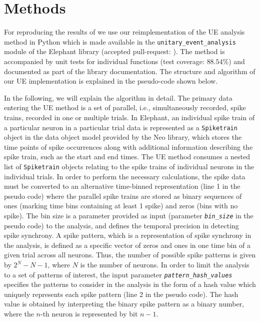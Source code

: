 \documentclass[10pt,a4paper,onecolumn]{article}
\begin{document}
\section{Methods}\label{methods}

For reproducing the results of \autocite{Riehle97} we use our
reimplementation of the UE analysis method in Python which is made
available in the \texttt{unitary\_event\_analysis} module of the
Elephant library (accepted pull-request: \autocite{Pullrequest_UE}). The
method is accompanied by unit tests for individual functions (test
coverage: \(88.54\%\)) and documented as part of the library
documentation. The structure and algorithm of our UE implementation is
explained in the pseudo-code shown below.

In the following, we will explain the algorithm in detail. The primary
data entering the UE method is a set of parallel, i.e., simultaneously
recorded, spike trains, recorded in one or multiple trials. In Elephant,
an individual spike train of a particular neuron in a particular trial
data is represented as a \texttt{Spiketrain} object in the data object
model provided by the Neo library, which stores the time points of spike
occurrences along with additional information describing the spike
train, such as the start and end times. The UE method consumes a nested
list of \texttt{Spiketrain} objects relating to the spike trains of
individual neurons in the individual trials. In order to perform the
necessary calculations, the spike data must be converted to an
alternative time-binned representation (line 1 in the pseudo code) where
the parallel spike trains are stored as binary sequences of ones
(marking time bins containing at least 1 spike) and zeros (bins with no
spike). The bin size is a parameter provided as input (parameter
\emph{\texttt{bin\_size}} in the pseudo code) to the analysis, and
defines the temporal precision in detecting spike synchrony. A spike
pattern, which is a representation of spike synchrony in the analysis,
is defined as a specific vector of zeros and ones in one time bin of a
given trial across all neurons. Thus, the number of possible spike
patterns is given by \(2^{N}-N-1\), where \(N\) is the number of
neurons. In order to limit the analysis to a set of patterns of
interest, the input parameter \emph{\texttt{pattern\_hash\_values}}
specifies the patterns to consider in the analysis in the form of a hash
value which uniquely represents each spike pattern (line 2 in the pseudo
code). The hash value is obtained by interpreting the binary spike
pattern as a binary number, where the \(n\)-th neuron is represented by
bit \(n-1\).
\end{document}
